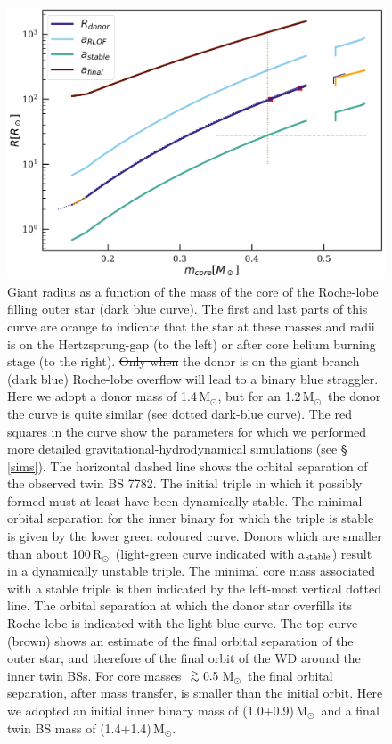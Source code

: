 \documentclass[twocolumn]{aastex62}
\newcommand{\MSun}{\mbox{M$_\odot$}}
\newcommand{\RSun}{\mbox{R$_\odot$}}
\def\apgt{\ {\raise-.5ex\hbox{$\buildrel>\over\sim$}}\ }
\providecommand{\DIFadd}[1]{{\protect\color{blue}\uwave{#1}}} %
\providecommand{\DIFdel}[1]{{\protect\color{red}\sout{#1}}}                      %
\providecommand{\DIFaddFL}[1]{\DIFadd{#1}} %
\providecommand{\DIFdelFL}[1]{\DIFdel{#1}} %
\providecommand{\DIFaddbeginFL}{} %
\providecommand{\DIFaddendFL}{} %
\providecommand{\DIFdelbeginFL}{} %
\providecommand{\DIFdelendFL}{} %
\begin{document}
\begin{figure}[ht!]
  \includegraphics[width=\columnwidth]{fig_M14MSun_outerorbit.pdf}
  \caption{Giant radius as a function of the mass of the core of the
    Roche-lobe filling outer star (dark blue curve).  The first and
    last parts of this curve are orange to indicate that the star at
    these masses and radii is on the Hertzsprung-gap (to the left) or
    after core helium burning stage (to the right).  \DIFdelbeginFL \DIFdelFL{Only when }\DIFdelendFL \DIFaddbeginFL \DIFaddFL{When }\DIFaddendFL the
    donor is on the giant branch (dark blue) Roche-lobe overflow will
    lead to a binary blue straggler.  Here we adopt a donor mass of
    1.4\,\MSun, but for an 1.2\,\MSun\, the donor the curve is quite
    similar (see dotted dark-blue curve).  The red squares in the
    curve show the parameters for which we performed more detailed
    gravitational-hydrodynamical simulations (see \S\,\ref{sims}).
    The horizontal dashed line shows the orbital separation of the
    observed twin BS 7782.  The initial triple in which it possibly
    formed must at least have been dynamically stable. The minimal
    orbital separation for the inner binary for which the triple is
    stable is given by the lower green coloured curve.  Donors which
    are smaller than about 100\,\RSun\, (light-green curve indicated
    with a$_{\rm stable}$) result in a dynamically unstable
    triple. The minimal core mass associated with a stable triple is
    then indicated by the left-most vertical dotted line.  The orbital
    separation at which the donor star overfills its Roche lobe is
    indicated with the light-blue curve. The top curve (brown) shows
    an estimate of the final orbital separation of the outer star, and
    therefore of the final orbit of the WD around the inner twin BSs.
    For core masses $\apgt 0.5$\,\MSun\, the final orbital separation,
    after mass transfer, is smaller than the initial orbit.  Here we
    adopted an initial inner binary mass of (1.0+0.9)\,\MSun\, and a
    final twin BS mass of (1.4+1.4)\,\MSun.
\label{fig:tertiarymass_vs_size}}
\end{figure}
\end{document}
